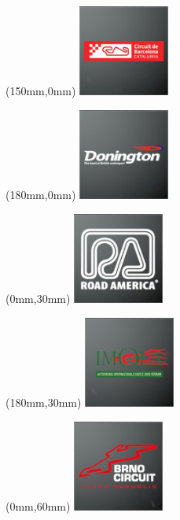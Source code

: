 \begin{textblock*}{30mm}(150mm,0mm)%
\includegraphics[width=30mm]{LG/2015-05-20_00078.png}
\end{textblock*}
\begin{textblock*}{30mm}(180mm,0mm)%
\includegraphics[width=30mm]{LG/2015-05-20_00080.png}
\end{textblock*}
\begin{textblock*}{30mm}(0mm,30mm)%
\includegraphics[width=30mm]{LG/2015-05-20_00092.png}
\end{textblock*}
\begin{textblock*}{30mm}(180mm,30mm)%
\includegraphics[width=30mm]{LG/2015-05-20_00083.png}
\end{textblock*}
\begin{textblock*}{30mm}(0mm,60mm)%
\includegraphics[width=30mm]{LG/2015-05-20_00075.png}
\end{textblock*}
